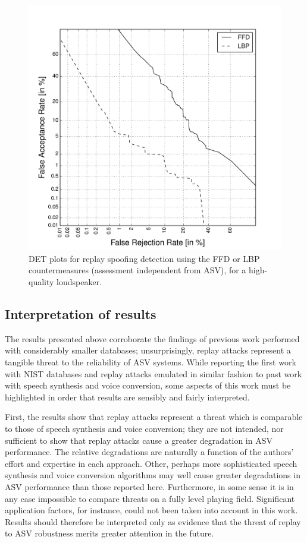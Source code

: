 \begin{figure}
	\centering
\includegraphics[width=1\linewidth]{Figs/DET_CM.pdf}
	\caption{DET plots for replay spoofing detection using the FFD or LBP countermeasures (assessment independent from ASV), for a high-quality loudspeaker.}
	\label{fig::DETs_CM}
\end{figure}



\subsection{Interpretation of results}

The results presented above corroborate the findings of previous work performed with considerably smaller databases; unsurprisingly, replay attacks represent a tangible threat to the reliability of ASV systems.  While reporting the first work with NIST databases and replay attacks emulated in similar fashion to past work with speech synthesis and voice conversion, some aspects of this work must be highlighted in order that results are sensibly and fairly interpreted.

First, the results show that replay attacks represent a threat which is comparable to those of speech synthesis and voice conversion; they are not intended, nor sufficient to show that replay attacks cause a greater degradation in ASV performance.  The relative degradations are naturally a function of the authors' effort and expertise in each approach.  Other, perhaps more sophisticated speech synthesis and voice conversion algorithms may well cause greater degradations in ASV performance than those reported here.  Furthermore, in some sense it is in any case impossible to compare threats on a fully level playing field.  Significant application factors, for instance, could not been taken into account in this work.  Results should therefore be interpreted only as evidence that the threat of replay to ASV robustness merits greater attention in the future.


